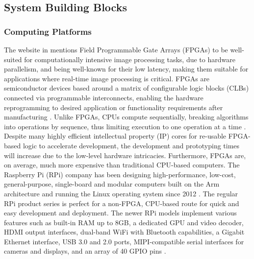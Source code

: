 \subsection{System Building Blocks}
\label{bi_bb}
\subsubsection{Computing Platforms}
The website in \cite{dev22adminGPUVsFPGA2023} mentions Field Programmable Gate Arrays (FPGAs) to be well-suited for computationally intensive image processing tasks, due to hardware parallelism, and being well-known for their low latency, making them suitable for applications where real-time image processing is critical. FPGAs are semiconductor devices based around a matrix of configurable logic blocks (CLBs) connected via programmable interconnects, enabling the hardware reprogramming to desired application or functionality requirements after manufacturing \cite{WhatFPGAField}. Unlike FPGAs, CPUs compute sequentially, breaking algorithms into operations by sequence, thus limiting execution to one operation at a time \cite{alexliangBoostingMachineVision2016}. Despite many highly efficient intellectual property (IP) cores for re-usable FPGA-based logic to accelerate development, the development and prototyping times will increase due to the low-level hardware intricacies. Furthermore, FPGAs are, on average, much more expensive than traditional CPU-based computers. The Raspberry Pi (RPi) company has been designing high-performance, low-cost, general-purpose, single-board and modular computers built on the Arm architecture and running the Linux operating system since 2012 \cite{raspberrypiRaspberryPiUs}. The regular RPi product series is perfect for a non-FPGA, CPU-based route for quick and easy development and deployment. The newer RPi models implement various features such as built-in RAM up to 8GB, a dedicated GPU and video decoder, HDMI output interfaces, dual-band WiFi with Bluetooth capabilities, a Gigabit Ethernet interface, USB 3.0 and 2.0 ports, MIPI-compatible serial interfaces for cameras and displays, and an array of 40 GPIO pins \cite{raspberrypiltdBuyRaspberryPi, raspberrypiltdBuyRaspberryPia}.

